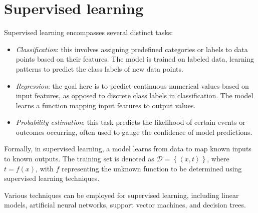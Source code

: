\section{Supervised learning}

Supervised learning encompasses several distinct tasks:
\begin{itemize}
    \item \textit{Classification}: this involves assigning predefined categories or labels to data points based on their features. 
        The model is trained on labeled data, learning patterns to predict the class labels of new data points.
    \item \textit{Regression}: the goal here is to predict continuous numerical values based on input features, as opposed to discrete class labels in classification. 
        The model learns a function mapping input features to output values.
    \item \textit{Probability estimation}: this task predicts the likelihood of certain events or outcomes occurring, often used to gauge the confidence of model predictions.
\end{itemize}
Formally, in supervised learning, a model learns from data to map known inputs to known outputs. 
The training set is denoted as $\mathcal{D}=\left\{\left\langle x,t \right\rangle\right\}$, where $t = f(x)$, with $f$ representing the unknown function to be determined using supervised learning techniques.

Various techniques can be employed for supervised learning, including linear models, artificial neural networks, support vector machines, and decision trees.